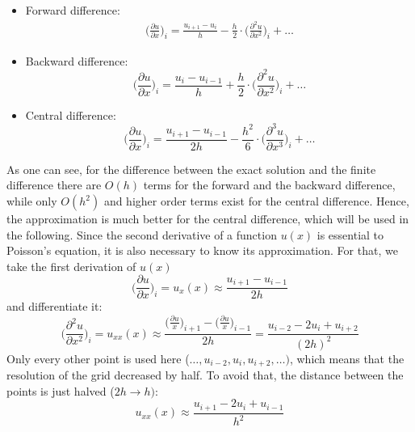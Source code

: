 \begin{itemize}
\item Forward difference: 
\begin{align}
\Big(\frac{\partial u}{\partial x}\Big)_i =  \frac{u_{i+1}-u_i}{h} - \frac{h}{2} \cdot \Big (\frac{\partial^2 u}{\partial x^2}\Big)_i + \hdots
\end{align}
\item Backward difference: 
\begin{equation}
\Big(\frac{\partial u}{\partial x}\Big)_i =  \frac{u_{i}-u_{i-1}}{h} + \frac{h}{2} \cdot \Big (\frac{\partial ^2 u}{\partial x^2}\Big)_i + \hdots
\end{equation}
\item Central difference: 
\begin{equation}
\Big(\frac{\partial u}{\partial x}\Big)_i =  \frac{u_{i+1} - u_{i-1}}{2h} - \frac{h^2}{6} \cdot \Big (\frac{\partial^3 u}{\partial x^3}\Big )_i + \hdots
\end{equation}
\end{itemize}

As one can see, for the difference between the exact solution and the finite difference there are $O(h)$ terms for the forward and the backward difference, while only $O(h^2)$ and higher order terms exist for the central difference. Hence, the approximation is much better for the central difference, which will be used in the following. Since the second derivative of a function $u(x)$ is essential to Poisson's equation, it is also necessary to know its approximation. For that, we take the first derivation of $u(x)$
\begin{equation}
 \Big(\frac{\partial u}{\partial x}\Big)_i = u_x(x) \approx    \frac{u_{i+1} - u_{i-1}}{2h}
\end{equation}
and differentiate it:
\begin{equation}
\Big(\frac{\partial^2 u}{\partial x^2}\Big)_i = u_{xx}(x) \approx   \frac{\big(\frac{\partial u}{x}\big)_{i+1}   -  \big(\frac{\partial u}{x}\big)_{i-1}  }{2h} = \frac{u_{i-2} - 2u_i + u_{i+2}}{(2h)^2} 
\end{equation}
Only every other point is used here ($\hdots, u_{i-2}, u_i, u_{i+2}, \hdots)$, which means that the resolution of the grid decreased by half. To avoid that, the distance between the points is just halved ($2h \rightarrow h)$: 
\begin{equation}
u_{xx}(x) \approx \frac{u_{i+1} - 2u_i + u_{i-1}}{h^2} 
\label{equ:uxx}
\end{equation}

